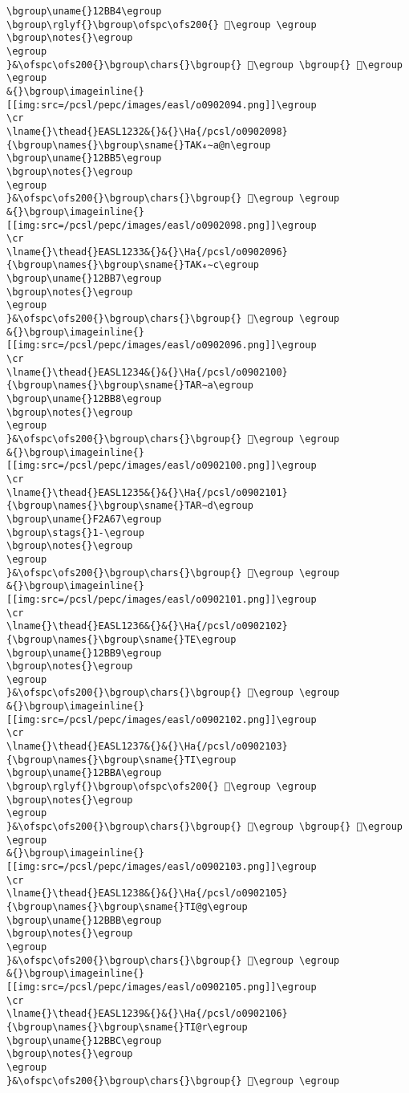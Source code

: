 \begin{verbatim}
\bgroup\uname{}12BB4\egroup
\bgroup\rglyf{}\bgroup\ofspc\ofs200{} 𒮴\egroup \egroup
\bgroup\notes{}\egroup
\egroup
}&\ofspc\ofs200{}\bgroup\chars{}\bgroup{} 𒮶\egroup \bgroup{} 𒮴\egroup \egroup
&{}\bgroup\imageinline{}[[img:src=/pcsl/pepc/images/easl/o0902094.png]]\egroup
\cr
\lname{}\thead{}EASL1232&{}&{}\Ha{/pcsl/o0902098}{\bgroup\names{}\bgroup\sname{}TAK₄∼a@n\egroup
\bgroup\uname{}12BB5\egroup
\bgroup\notes{}\egroup
\egroup
}&\ofspc\ofs200{}\bgroup\chars{}\bgroup{} 𒮵\egroup \egroup
&{}\bgroup\imageinline{}[[img:src=/pcsl/pepc/images/easl/o0902098.png]]\egroup
\cr
\lname{}\thead{}EASL1233&{}&{}\Ha{/pcsl/o0902096}{\bgroup\names{}\bgroup\sname{}TAK₄∼c\egroup
\bgroup\uname{}12BB7\egroup
\bgroup\notes{}\egroup
\egroup
}&\ofspc\ofs200{}\bgroup\chars{}\bgroup{} 𒮷\egroup \egroup
&{}\bgroup\imageinline{}[[img:src=/pcsl/pepc/images/easl/o0902096.png]]\egroup
\cr
\lname{}\thead{}EASL1234&{}&{}\Ha{/pcsl/o0902100}{\bgroup\names{}\bgroup\sname{}TAR∼a\egroup
\bgroup\uname{}12BB8\egroup
\bgroup\notes{}\egroup
\egroup
}&\ofspc\ofs200{}\bgroup\chars{}\bgroup{} 𒮸\egroup \egroup
&{}\bgroup\imageinline{}[[img:src=/pcsl/pepc/images/easl/o0902100.png]]\egroup
\cr
\lname{}\thead{}EASL1235&{}&{}\Ha{/pcsl/o0902101}{\bgroup\names{}\bgroup\sname{}TAR∼d\egroup
\bgroup\uname{}F2A67\egroup
\bgroup\stags{}1-\egroup
\bgroup\notes{}\egroup
\egroup
}&\ofspc\ofs200{}\bgroup\chars{}\bgroup{} 󲩧\egroup \egroup
&{}\bgroup\imageinline{}[[img:src=/pcsl/pepc/images/easl/o0902101.png]]\egroup
\cr
\lname{}\thead{}EASL1236&{}&{}\Ha{/pcsl/o0902102}{\bgroup\names{}\bgroup\sname{}TE\egroup
\bgroup\uname{}12BB9\egroup
\bgroup\notes{}\egroup
\egroup
}&\ofspc\ofs200{}\bgroup\chars{}\bgroup{} 𒮹\egroup \egroup
&{}\bgroup\imageinline{}[[img:src=/pcsl/pepc/images/easl/o0902102.png]]\egroup
\cr
\lname{}\thead{}EASL1237&{}&{}\Ha{/pcsl/o0902103}{\bgroup\names{}\bgroup\sname{}TI\egroup
\bgroup\uname{}12BBA\egroup
\bgroup\rglyf{}\bgroup\ofspc\ofs200{} 𒮺\egroup \egroup
\bgroup\notes{}\egroup
\egroup
}&\ofspc\ofs200{}\bgroup\chars{}\bgroup{} 𒮺\egroup \bgroup{} 𒮾\egroup \egroup
&{}\bgroup\imageinline{}[[img:src=/pcsl/pepc/images/easl/o0902103.png]]\egroup
\cr
\lname{}\thead{}EASL1238&{}&{}\Ha{/pcsl/o0902105}{\bgroup\names{}\bgroup\sname{}TI@g\egroup
\bgroup\uname{}12BBB\egroup
\bgroup\notes{}\egroup
\egroup
}&\ofspc\ofs200{}\bgroup\chars{}\bgroup{} 𒮻\egroup \egroup
&{}\bgroup\imageinline{}[[img:src=/pcsl/pepc/images/easl/o0902105.png]]\egroup
\cr
\lname{}\thead{}EASL1239&{}&{}\Ha{/pcsl/o0902106}{\bgroup\names{}\bgroup\sname{}TI@r\egroup
\bgroup\uname{}12BBC\egroup
\bgroup\notes{}\egroup
\egroup
}&\ofspc\ofs200{}\bgroup\chars{}\bgroup{} 𒮼\egroup \egroup

\end{verbatim}

